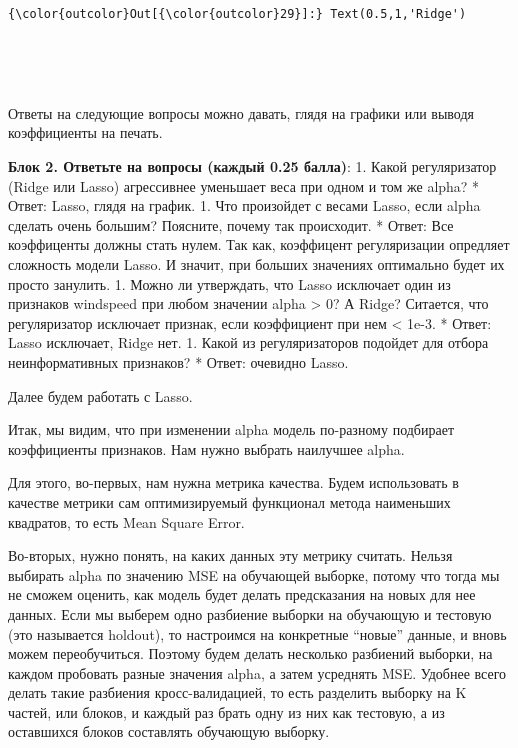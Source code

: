 \documentclass[11pt]{article}
\begin{document}
\begin{Verbatim}[commandchars=\\\{\}]
{\color{outcolor}Out[{\color{outcolor}29}]:} Text(0.5,1,'Ridge')
\end{Verbatim}
            
    \begin{center}
    \end{center}
    { \hspace*{\fill} \\}
    
    \begin{center}
    \end{center}
    { \hspace*{\fill} \\}
    
    Ответы на следующие вопросы можно давать, глядя на графики или выводя
коэффициенты на печать.

\textbf{Блок 2. Ответьте на вопросы (каждый 0.25 балла)}: 1. Какой
регуляризатор (Ridge или Lasso) агрессивнее уменьшает веса при одном и
том же alpha? * Ответ: Lasso, глядя на график. 1. Что произойдет с
весами Lasso, если alpha сделать очень большим? Поясните, почему так
происходит. * Ответ: Все коэффиценты должны стать нулем. Так как,
коэффицент регуляризации опредляет сложность модели Lasso. И значит, при
больших значениях оптимально будет их просто занулить. 1. Можно ли
утверждать, что Lasso исключает один из признаков windspeed при любом
значении alpha \textgreater{} 0? А Ridge? Ситается, что регуляризатор
исключает признак, если коэффициент при нем \textless{} 1e-3. * Ответ:
Lasso исключает, Ridge нет. 1. Какой из регуляризаторов подойдет для
отбора неинформативных признаков? * Ответ: очевидно Lasso.

    Далее будем работать с Lasso.

Итак, мы видим, что при изменении alpha модель по-разному подбирает
коэффициенты признаков. Нам нужно выбрать наилучшее alpha.

    Для этого, во-первых, нам нужна метрика качества. Будем использовать в
качестве метрики сам оптимизируемый функционал метода наименьших
квадратов, то есть Mean Square Error.

Во-вторых, нужно понять, на каких данных эту метрику считать. Нельзя
выбирать alpha по значению MSE на обучающей выборке, потому что тогда мы
не сможем оценить, как модель будет делать предсказания на новых для нее
данных. Если мы выберем одно разбиение выборки на обучающую и тестовую
(это называется holdout), то настроимся на конкретные ``новые'' данные,
и вновь можем переобучиться. Поэтому будем делать несколько разбиений
выборки, на каждом пробовать разные значения alpha, а затем усреднять
MSE. Удобнее всего делать такие разбиения кросс-валидацией, то есть
разделить выборку на K частей, или блоков, и каждый раз брать одну из
них как тестовую, а из оставшихся блоков составлять обучающую выборку.
\end{document}
